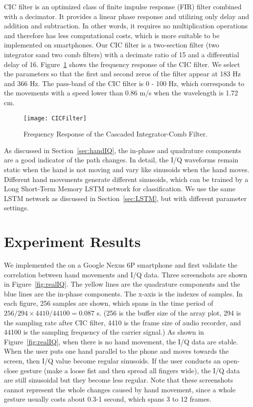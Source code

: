 CIC filter is an optimized class of finite impulse response (FIR) filter combined with a decimator. It provides a linear phase response and utilizing only delay and addition and subtraction. In other words, it requires no multiplication operations and therefore has less computational costs, which is more suitable to be implemented on smartphones.
%
Our CIC filter is a two-section filter (two integrator sand two comb filters) with a decimate ratio of 15 and a differential delay of 16. Figure~\ref{fig:CICFilter} shows the frequency response of the CIC filter. We select the parameters so that the first and second zeros of the filter appear at 183 Hz and 366 Hz. The pass-band of the CIC filter is 0 - 100 Hz, which corresponds to the movements with a speed lower than 0.86 m/s when the wavelength is 1.72 cm. 

\begin{figure}[h]
	\centering
	\texttt{[image: CICFilter]}
	\caption{Frequency Response of the Cascaded Integrator-Comb Filter.}
	\label{fig:CICFilter}
\end{figure}

As discussed in Section~\ref{sec:handIQ}, the in-phase and quadrature components are a good indicator of the path changes. In detail, the I/Q waveforms remain static when the hand is not moving and vary like sinusoids when the hand moves. Different hand movements generate different sinusoids, which can be trained by a Long Short-Term Memory LSTM network for classification. We use the same LSTM network as discussed in Section~\ref{sec:LSTM}, but with different parameter settings.

\section{Experiment Results}

We implemented the {\uu} on a Google Nexus 6P smartphone and first validate the correlation between hand movements and I/Q data.
Three screenshots are shown in Figure~\ref{fig:realIQ}. The yellow lines are the quadrature components and the blue lines are the in-phase components. The x-axis is the indexes of samples. In each figure, 256 samples are shown, which spans in the time period of $256/294\times4410/44100 = 0.087$ s. (256 is the buffer size of the array plot, 294 is the sampling rate after CIC filter, 4410 is the frame size of audio recorder, and 44100 is the sampling frequency of the carrier signal.) As shown in Figure~\ref{fig:realIQ}, when there is no hand movement, the I/Q data are stable. When the user puts one hand parallel to the phone and moves towards the screen, then I/Q value become regular sinusoids. If the user conducts an open-close gesture (make a loose fist and then spread all fingers wide), the I/Q data are still sinusoidal but they become less regular. Note that these screenshots cannot represent the whole changes caused by hand movement, since a whole gesture usually costs about 0.3-1 second, which spans 3 to 12 frames.


